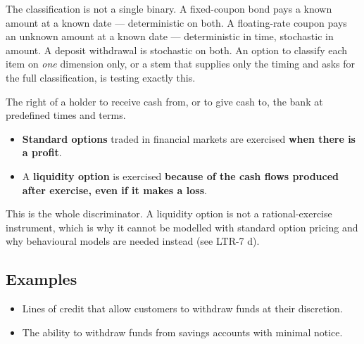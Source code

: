 \begin{lrtrapbox}
The classification is not a single binary. A fixed-coupon bond pays a known amount at a known date --- deterministic on both. A floating-rate coupon pays an unknown amount at a known date --- deterministic in time, stochastic in amount. A deposit withdrawal is stochastic on both. An option to classify each item on \emph{one} dimension only, or a stem that supplies only the timing and asks for the full classification, is testing exactly this.
\end{lrtrapbox}


\begin{lrdefbox}
The right of a holder to receive cash from, or to give cash to, the bank at predefined times and terms.
\end{lrdefbox}

\begin{lrkeybox}
\begin{itemize}
\item \textbf{Standard options} traded in financial markets are exercised \textbf{when there is a profit}.
\item A \textbf{liquidity option} is exercised \textbf{because of the cash flows produced after exercise, even if it makes a loss}.
\end{itemize}
This is the whole discriminator. A liquidity option is not a rational-exercise instrument, which is why it cannot be modelled with standard option pricing and why behavioural models are needed instead (see LTR-7 d).
\end{lrkeybox}

\subsection{Examples}

\begin{itemize}
\item Lines of credit that allow customers to withdraw funds at their discretion.
\item The ability to withdraw funds from savings accounts with minimal notice.
\end{itemize}

